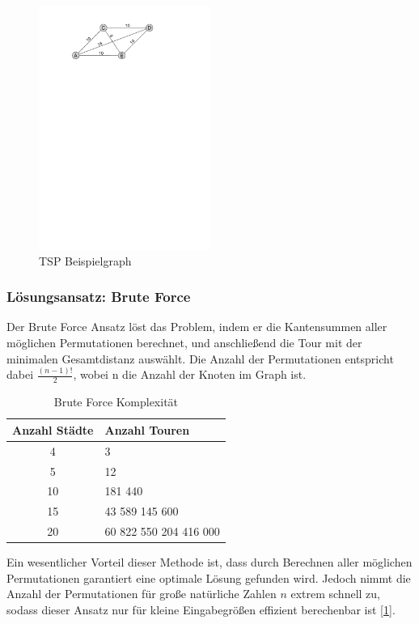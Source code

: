 \documentclass[pdftex,
               12pt,
               DIV=12,
               a4paper,
               twoside,
               parskip=half,
               abstract=true,
               dvipsnames]{scrartcl}
\begin{document}
	\begin{figure}[h]
		\centering
		\includegraphics[width=0.5\textwidth, page=1]{aco_tspgraph}
		\caption{TSP Beispielgraph} \label{fig:ACO_tspgraph}
	\end{figure}


\subsubsection{L\"osungsansatz: Brute Force}
Der Brute Force Ansatz l\"ost das Problem, indem er die Kantensummen aller m\"oglichen Permutationen berechnet, und anschlie\ss end die Tour mit der minimalen Gesamtdistanz ausw\"ahlt. Die Anzahl der Permutationen entspricht dabei $\frac{(n-1)!}{2}$, wobei n die Anzahl der Knoten im Graph ist. \cite[vgl.][]{Rimscha17}

\begin{table}[ht]
	\begin{center}
	\begin{tabular}{|c|l|} \hline
		\textbf{Anzahl St\"adte} & \textbf{Anzahl Touren} \\
		\hline
		4 & 3 \\
		5 & 12 \\
		10 & 181 440 \\
		15 & 43 589 145 600 \\
		20 & 60 822 550 204 416 000\\
		\hline
	\end{tabular}
	\caption{Brute Force Komplexit\"at} \label{tab:ACO_bruteforce}
		\end{center}
\end{table}

Ein wesentlicher Vorteil dieser Methode ist, dass durch Berechnen aller m\"oglichen Permutationen garantiert eine optimale L\"osung gefunden wird. Jedoch nimmt die Anzahl der Permutationen f\"ur gro\ss e nat\"urliche Zahlen $n$ extrem schnell zu, sodass dieser Ansatz nur f\"ur kleine Eingabegr\"o\ss en effizient berechenbar ist [\cref{tab:ACO_bruteforce}].
\end{document}
